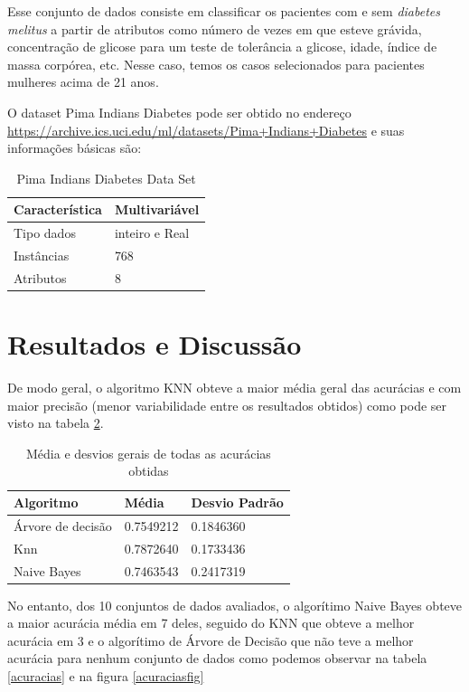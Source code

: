 \documentclass[12pt, a4paper]{article}
\begin{document}
Esse conjunto de dados consiste em classificar os pacientes com e sem \textit{diabetes melitus} a partir de atributos como número de vezes em que esteve grávida, concentração de glicose para um teste de tolerância a glicose, idade, índice de massa corpórea, etc.
Nesse caso, temos os casos selecionados para pacientes mulheres acima de 21 anos.

O dataset Pima Indians Diabetes pode ser obtido no endereço \url{https://archive.ics.uci.edu/ml/datasets/Pima+Indians+Diabetes} e suas informações básicas são:
\begin{table}[!ht]
\centering
\caption{Pima Indians Diabetes Data Set}
\label{pimatable}
\begin{tabular}{|l|l|}
\hline
Característica & Multivariável\\
\hline
Tipo dados & inteiro e Real \\
\hline
Instâncias & 768 \\
\hline
Atributos & 8\\
\hline
\end{tabular}
\end{table}

\section{Resultados e Discussão}

De modo geral, o algoritmo KNN obteve a maior média geral das acurácias e com maior precisão (menor variabilidade entre os resultados obtidos) como pode ser visto na tabela \ref{acuracias_geral}.


\begin{table}[!ht]
\centering
\caption{Média e desvios gerais de todas as acurácias obtidas}
\label{acuracias_geral}
\begin{tabular}{|l|l|l|}
\hline
Algoritmo & Média & Desvio Padrão\\
\hline
Árvore de decisão & 0.7549212 &0.1846360\\
Knn & 0.7872640 &0.1733436 \\
Naive Bayes &
0.7463543 &0.2417319\\
\hline
\end{tabular}
\end{table}

No entanto, dos 10 conjuntos de dados avaliados, o algorítimo Naive Bayes obteve a maior acurácia média em 7 deles, seguido do KNN que obteve a melhor acurácia em 3 e o algorítimo de Árvore de Decisão que não teve a melhor acurácia para nenhum conjunto de dados como podemos observar na tabela \ref{acuracias} e na figura \ref{acuraciasfig}
\end{document}
